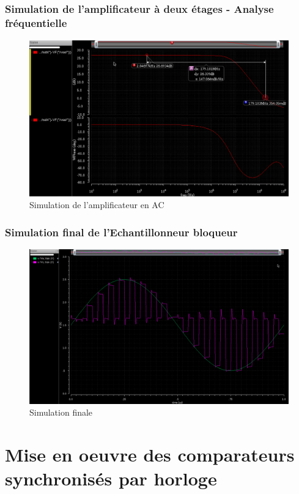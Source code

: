 \documentclass{beamer}
\begin{document}
\begin{frame}
\frametitle{Simulation de l'amplificateur \`a deux \'etages - Analyse fr\'equentielle}

\begin{figure}[!htb]
  \includegraphics[width=0.8\linewidth]{ampli_bode.png}
  \caption{Simulation de l'amplificateur en AC}
\end{figure}

\end{frame}


\begin{frame}
\frametitle{Simulation final de l'Echantillonneur bloqueur}

\begin{figure}[!htb]
  \includegraphics[width=0.8\linewidth]{echantillonneur_bloqueur_sim_reelle.png}
  \caption{Simulation finale}
\end{figure}

\end{frame}


\section{Mise en oeuvre des comparateurs synchronis\'es par horloge}
\end{document}
